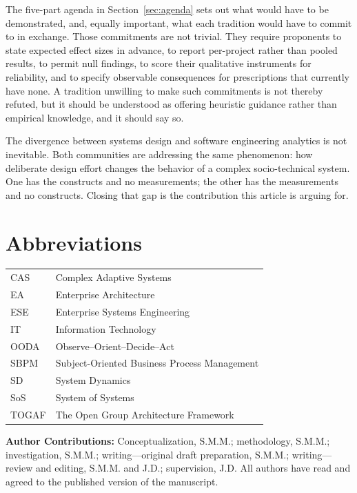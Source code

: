 \documentclass[11pt,a4paper]{article}
\begin{document}
The five-part agenda in Section~\ref{sec:agenda} sets out what would have to be
demonstrated, and, equally important, what each tradition would have to commit
to in exchange. Those commitments are not trivial. They require proponents to
state expected effect sizes in advance, to report per-project rather than pooled
results, to permit null findings, to score their qualitative instruments for
reliability, and to specify observable consequences for prescriptions that
currently have none. A tradition unwilling to make such commitments is not
thereby refuted, but it should be understood as offering heuristic guidance
rather than empirical knowledge, and it should say so.

The divergence between systems design and software engineering analytics is not
inevitable. Both communities are addressing the same phenomenon: how deliberate
design effort changes the behavior of a complex socio-technical system. One has
the constructs and no measurements; the other has the measurements and no
constructs. Closing that gap is the contribution this article is arguing for.


\section*{Abbreviations}
\begin{tabular}{@{}ll@{}}
CAS   & Complex Adaptive Systems \\
EA    & Enterprise Architecture \\
ESE   & Enterprise Systems Engineering \\
IT    & Information Technology \\
OODA  & Observe--Orient--Decide--Act \\
SBPM  & Subject-Oriented Business Process Management \\
SD    & System Dynamics \\
SoS   & System of Systems \\
TOGAF & The Open Group Architecture Framework \\
\end{tabular}

\vspace{1em}
\noindent\textbf{Author Contributions:} Conceptualization, S.M.M.; methodology,
S.M.M.; investigation, S.M.M.; writing---original draft preparation, S.M.M.;
writing---review and editing, S.M.M. and J.D.; supervision, J.D. All authors
have read and agreed to the published version of the manuscript.
\end{document}
